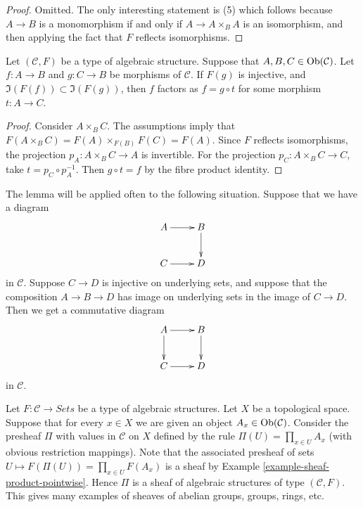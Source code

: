 \begin{proof}
Omitted. The only interesting statement is (5) which
follows because $A \to B$ is a monomorphism if and only if
$A \to A \times_B A$ is an isomorphism, and then applying
the fact that $F$ reflects isomorphisms.
\end{proof}

\begin{lemma}
\label{lemma-image-contained-in}
Let $(\mathcal{C}, F)$ be a type of algebraic structure.
Suppose that $A, B, C \in \mathop{\mathrm{Ob}}\nolimits(\mathcal{C})$.
Let $f : A \to B$ and $g : C \to B$ be morphisms of
$\mathcal{C}$. If $F(g)$ is injective, and
$\Im(F(f)) \subset \Im(F(g))$, then
$f$ factors as $f = g \circ t$ for some morphism
$t : A \to C$.
\end{lemma}

\begin{proof}
Consider $A \times_B C$. The assumptions imply that
$F(A \times_B C) = F(A) \times_{F(B)} F(C) = F(A)$.
Since $F$ reflects isomorphisms, the projection $p_A : A \times_B C \to A$ is invertible.
For the projection $p_C : A \times_B C \to C$, take $t = p_C \circ p_A^{-1}$. Then $g \circ t = f$ by the fibre product identity.
\end{proof}

\begin{example}
\label{example-application-lemma-image-contained-in}
The lemma will be applied often to the following situation.
Suppose that we have a diagram
$$
\xymatrix{
A \ar[r] & B \ar[d] \\
C \ar[r] & D
}
$$
in $\mathcal{C}$. Suppose $C \to D$ is injective on underlying
sets, and suppose that the composition $A \to B \to D$ has
image on underlying sets in the image of $C \to D$.
Then we get a commutative diagram
$$
\xymatrix{
A \ar[r] \ar[d] & B \ar[d] \\
C \ar[r] & D
}
$$
in $\mathcal{C}$.
\end{example}

\begin{example}
\label{example-sheaf-product-pointwise-algebraic-structure}
Let $F : \mathcal{C} \to \textit{Sets}$ be a
type of algebraic structures.
Let $X$ be a topological space. Suppose that
for every $x \in X$ we are given an object
$A_x \in \mathop{\mathrm{Ob}}\nolimits(\mathcal{C})$. Consider the presheaf
$\Pi$ with values in $\mathcal{C}$ on $X$ defined by the rule
$\Pi(U) = \prod_{x \in U} A_x$ (with obvious restriction
mappings). Note that the associated presheaf of sets
$U \mapsto F(\Pi(U)) = \prod_{x \in U} F(A_x)$ is a sheaf
by Example \ref{example-sheaf-product-pointwise}.
Hence $\Pi$ is a sheaf of algebraic structures
of type $(\mathcal{C} , F)$. This gives many examples
of sheaves of abelian groups, groups, rings, etc.
\end{example}














